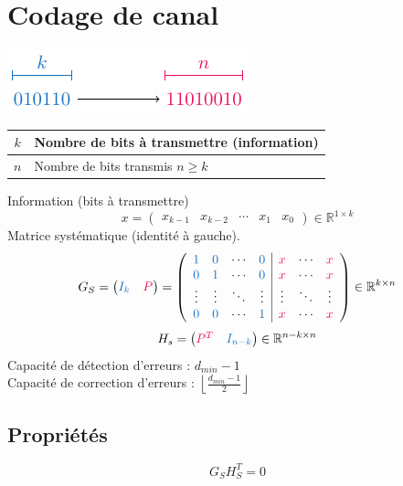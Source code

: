 \documentclass[resume.tex]{subfiles}
\begin{document}
\section{Codage de canal}
\begin{center}
\includegraphics[scale=1,page=1]{drwg_1.pdf}
\end{center}
\begin{center}
\begin{tabular}{c|l}
$k$ & Nombre de bits à transmettre (information)\\\hline
$n$ & Nombre de bits transmis $n\geq k$
\end{tabular}
\end{center}
Information (bits à transmettre)
$$x=\begin{pmatrix}
x_{k-1} &
x_{k-2} &
\cdots &
x_1 &
x_0
\end{pmatrix}\in \mathbb{R}^{1\times k}$$
Matrice systématique (identité à gauche).
$$G_S=\begin{pmatrix}
\textcolor{RoyalBlue}{I_k} & \textcolor{OrangeRed}{P}
\end{pmatrix}=
\left(\begin{array}{cccc|cccc}
\textcolor{RoyalBlue}{1} & \textcolor{RoyalBlue}{0} & \cdots & \textcolor{RoyalBlue}{0} & \textcolor{OrangeRed}{x} & \cdots & \textcolor{OrangeRed}{x}\\
\textcolor{RoyalBlue}{0} & \textcolor{RoyalBlue}{1} & \cdots & \textcolor{RoyalBlue}{0} & \textcolor{OrangeRed}{x} & \cdots & \textcolor{OrangeRed}{x}\\
\vdots & \vdots & \ddots & \vdots & \vdots & \ddots & \vdots\\
\textcolor{RoyalBlue}{0} & \textcolor{RoyalBlue}{0} & \cdots & \textcolor{RoyalBlue}{1} & \textcolor{OrangeRed}{x} & \cdots & \textcolor{OrangeRed}{x}
\end{array}\right)\in\mathbb{R}^{k\times n}$$
$$H_s=\begin{pmatrix}
\textcolor{OrangeRed}{P^{T}} & \textcolor{RoyalBlue}{I_{n-k}}
\end{pmatrix}\in\mathbb{R}^{n-k\times n}$$
Capacité de détection d'erreurs : $d_{min}-1$\\
Capacité de correction d'erreurs : $\left\lfloor\frac{d_{min}-1}{2}\right\rfloor$


\subsection{Propriétés}
$$G_SH_S^T=0$$
\end{document}
